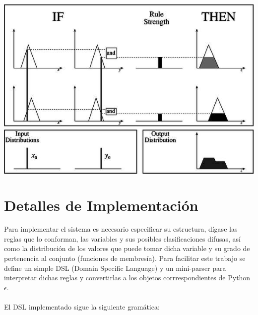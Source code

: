 \documentclass[a4paper, 12pt]{article}
\begin{document}
\includegraphics[scale = 0.5]{mamdani_process.jpg}

\section*{Detalles de Implementaci\'on}
Para implementar el sistema es necesario especificar su estructura, d\'igase las reglas que lo conforman,
las variables y sus posibles clasificaciones difusas, as\'i como la distribuci\'on de los valores que puede
tomar dicha variable y su grado de pertenencia al conjunto (funciones de membres\'ia). Para facilitar este trabajo
se define un simple DSL (Domain Specific Language) y un mini-parser para interpretar dichas reglas y convertirlas
a los objetos corrrespondientes de Python $\epsilon$.
\paragraph{}
El DSL implementado sigue la siguiente gram\'atica:
\end{document}
